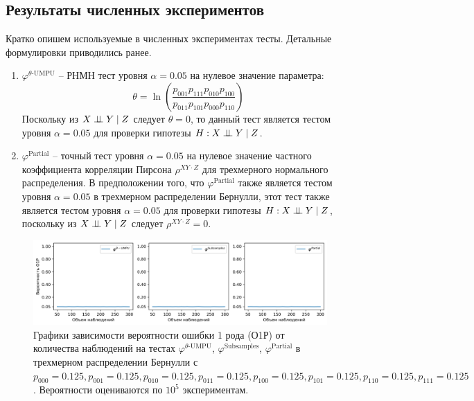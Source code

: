 \begin{centering}
    \subsection{Результаты численных экспериментов}
\end{centering}

Кратко опишем используемые в численных экспериментах тесты.
Детальные формулировки приводились ранее.
\begin{enumerate}
    \item $\varphi^{\text{$\theta$-UMPU}}$ -- РНМН тест уровня 
    $\alpha=0.05$ на нулевое значение параметра: $$\theta = \ln  \left(\dfrac{p_{001}p_{111}p_{010}p_{100}}{p_{011}p_{101}p_{000}p_{110}}\right)$$
    Поскольку из $X \perp\!\!\!\perp Y \mid Z$ следует $\theta=0$, 
    то данный тест является тестом уровня $\alpha=0.05$ для проверки
    гипотезы $H:X \perp\!\!\!\perp Y \mid Z$.
    \item $\varphi^{\text{Partial}}$ -- точный тест уровня $\alpha=0.05$
    на нулевое значение частного коэффициента корреляции
    Пирсона $\rho^{XY\cdot Z}$ для трехмерного нормального распределения.
    В предположении того, что $\varphi^{\text{Partial}}$ также является тестом
    уровня $\alpha=0.05$ в трехмерном распределении Бернулли, 
    этот тест также является тестом уровня $\alpha=0.05$ для проверки
    гипотезы $H:X \perp\!\!\!\perp Y \mid Z$,
    поскольку из $X \perp\!\!\!\perp Y \mid Z$ следует $\rho^{XY\cdot Z}=0$.
\end{enumerate}

\begin{figure}[H]
    \centering
    \includegraphics[scale=0.65]{images/graph1.png}
    \caption{Графики зависимости вероятности ошибки 1 рода (О1Р) от количества наблюдений
    на тестах $\varphi^{\text{$\theta$-UMPU}}$, $\varphi^{\text{Subsamples}}$, $\varphi^{\text{Partial}}$
    в трехмерном распределении Бернулли с $p_{000}=0.125, p_{001}=0.125, p_{010}=0.125, p_{011}=0.125,
    p_{100}=0.125, p_{101}=0.125, p_{110}=0.125, p_{111}=0.125$. Вероятности оцениваются по $10^5$ экспериментам.} \label{fig:1}
\end{figure}
    

